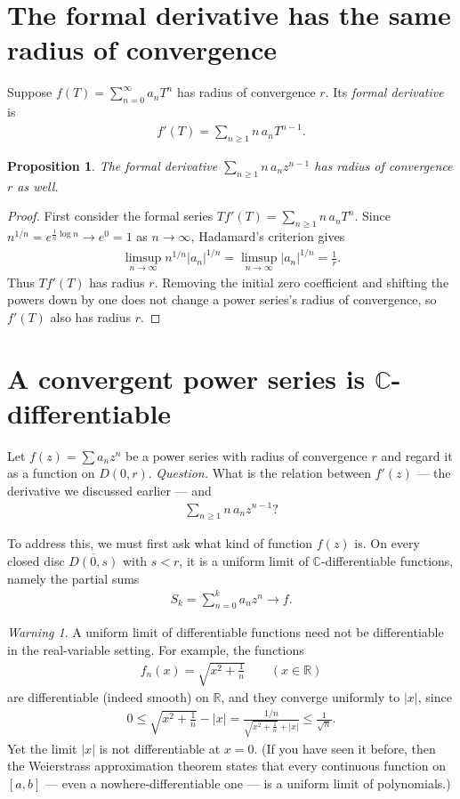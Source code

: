 \documentclass[11pt]{article}
\theoremstyle{plain}
\newtheorem{proposition}[theorem]{Proposition}
\theoremstyle{definition}
\theoremstyle{remark}
\newtheorem*{warning}{Warning}
\numberwithin{equation}{section}
\newcommand{\be}{\begin{eqnarray}}
\newcommand{\ee}{\end{eqnarray}}
\newcommand{\C}{\mathbb{C}}
\newcommand{\R}{\mathbb{R}}
\begin{document}
\section{The formal derivative has the same radius of convergence}
Suppose $f(T)=\sum_{n=0}^{\infty} a_nT^n$ has radius of convergence $r$. Its
\emph{formal derivative} is
\be
 f'(T)=\sum_{n\geq1}n\,a_nT^{n-1}.
\ee

\begin{proposition}
\label{prop:roc-derivative}
The formal derivative $\sum_{n\geq1}n\,a_nz^{n-1}$ has radius of convergence
$r$ as well.
\end{proposition}

\begin{proof}
First consider the formal series $T f'(T)=\sum_{n\geq1}n\,a_nT^n$. Since
$n^{1/n}=e^{\frac1n\log n}\longrightarrow e^0=1$ as $ n \rightarrow \infty$, Hadamard's criterion gives
\be
 \limsup_{n\to\infty}n^{1/n}|a_n|^{1/n}
 =\limsup_{n\to\infty}|a_n|^{1/n}
 =\frac1r.
\ee
Thus $T f'(T)$ has radius $r$. Removing the initial zero coefficient and
shifting the powers down by one does not change a power series's radius of
convergence, so $f'(T)$ also has radius $r$.
\end{proof}

\section{A convergent power series is \texorpdfstring{$\C$}{C}-differentiable}
Let $f(z)=\sum a_nz^n$ be a power series with radius of convergence $r$ and regard it as a function on $D(0,r)$. \emph{Question.} What is the relation between $f'(z)$ --- the derivative we
discussed earlier --- and \be \sum_{n\geq1}n\,a_nz^{n-1} ? \ee

To address this, we must first ask what kind of function $f(z)$ is. On every
closed disc $\overline{D(0,s)}$ with $s<r$, it is a uniform limit of
$\C$-differentiable functions, namely the partial sums
\be
 S_k=\sum_{n=0}^{k}a_nz^n\longrightarrow f.
\ee

\begin{warning}
A uniform limit of differentiable functions need not be differentiable in
the real-variable setting. For example, the functions
\be
 f_n(x)=\sqrt{x^2+\tfrac1n}\qquad(x\in\R)
\ee
are differentiable (indeed smooth) on $\R$, and they converge uniformly to
$|x|$, since
\be
 0\leq\sqrt{x^2+\tfrac1n}-|x|
 =\frac{1/n}{\sqrt{x^2+\frac1n}+|x|}
 \leq\frac1{\sqrt n}.
\ee
Yet the limit $|x|$ is not differentiable at $x=0$. (If you have seen it before, then the 
Weierstrass approximation theorem states that every continuous function on $[a,b]$ --- even a
nowhere-differentiable one --- is a uniform limit of polynomials.)
\end{warning}
\end{document}

